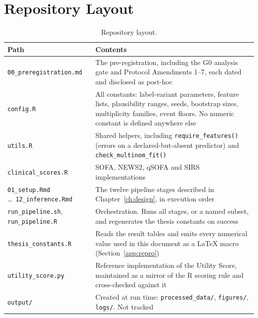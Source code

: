 \section{Repository Layout}

\begin{table}[H]
    \centering\small
    \begin{tabular}{p{4.6cm}p{8.4cm}}
        \toprule
        \textbf{Path} & \textbf{Contents} \\
        \midrule
        \texttt{00\_preregistration.md} &
        The pre-registration, including the G0 analysis gate and Protocol
        Amendments 1--7, each dated and disclosed as post-hoc \\
        \addlinespace
        \texttt{config.R} &
        All constants: label-variant parameters, feature lists, plausibility
        ranges, seeds, bootstrap sizes, multiplicity families, event floors.
        No numeric constant is defined anywhere else \\
        \addlinespace
        \texttt{utils.R} &
        Shared helpers, including \texttt{require\_features()} (errors on a
        declared-but-absent predictor) and \texttt{check\_multinom\_fit()} \\
        \addlinespace
        \texttt{clinical\_scores.R} &
        SOFA, NEWS2, qSOFA and SIRS implementations \\
        \addlinespace
        \texttt{01\_setup.Rmd} \dots\ \texttt{12\_inference.Rmd} &
        The twelve pipeline stages described in Chapter~\ref{ch:design}, in
        execution order \\
        \addlinespace
        \texttt{run\_pipeline.sh}, \texttt{run\_pipeline.R} &
        Orchestration. Runs all stages, or a named subset, and regenerates the
        thesis constants on success \\
        \addlinespace
        \texttt{thesis\_constants.R} &
        Reads the result tables and emits every numerical value used in this
        document as a \LaTeX{} macro (Section~\ref{app:repro}) \\
        \addlinespace
        \texttt{utility\_score.py} &
        Reference implementation of the Utility Score, maintained as a mirror
        of the R scoring rule and cross-checked against it \\
        \addlinespace
        \texttt{output/} &
        Created at run time: \texttt{processed\_data/}, \texttt{figures/},
        \texttt{logs/}. Not tracked \\
        \bottomrule
    \end{tabular}
    \caption{Repository layout.}
    \label{tab:repo_layout}
\end{table}

